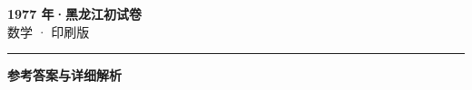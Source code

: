 \documentclass[zihao=5, a4paper]{ctexart}
\begin{document}
\begin{center}
  {\Large\bfseries 1977 年·黑龙江初试卷}\\[4pt]
  {\large 数学 · 印刷版}
\end{center}
\medskip
{}

\par\bigskip\hrule\bigskip
{}
\begin{center}{\large\bfseries 参考答案与详细解析}\end{center}
\smallskip

\end{document}
